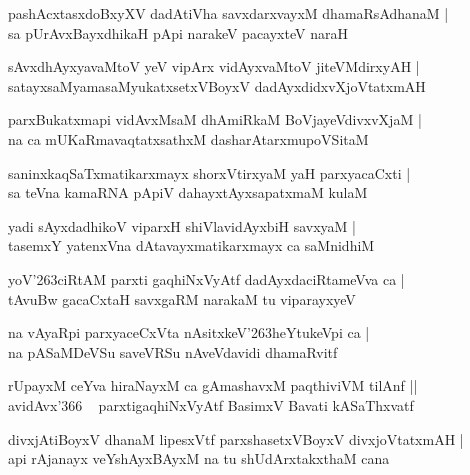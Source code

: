 \documentclass[twoside,12pt,openright]{book}
\def\S{\char'263}
\newcounter{shloka}[chapter]
\begin{document}
\begin{shloka}
pashAcxtasxdoBxyXV dadAtiVha savxdarxvayxM dhamaRsAdhanaM |\\
sa pUrAvxBayxdhikaH pApi narakeV pacayxteV naraH 
\end{shloka}

\begin{shloka}
sAvxdhAyxyavaMtoV yeV vipArx vidAyxvaMtoV jiteVMdirxyAH |\\
satayxsaMyamasaMyukatxsetxVBoyxV dadAyxdidxvXjoVtatxmAH 
\end{shloka}

\begin{shloka}
parxBukatxmapi vidAvxMsaM dhAmiRkaM BoVjayeVdivxvXjaM |\\
na ca mUKaRmavaqtatxsathxM  dasharAtarxmupoVSitaM 
\end{shloka}

\begin{shloka}
saninxkaqSaTxmatikarxmayx shorxVtirxyaM yaH parxyacaCxti |\\
sa teVna kamaRNA pApiV dahayxtAyxsapatxmaM kulaM 
\end{shloka}

\begin{shloka}
yadi sAyxdadhikoV viparxH shiVlavidAyxbiH savxyaM |\\
tasemxY yatenxVna dAtavayxmatikarxmayx ca saMnidhiM 
\end{shloka}

\begin{shloka}
yoV\S ciRtAM parxti gaqhiNxVyAtf dadAyxdaciRtameVva ca |\\
tAvuBw gacaCxtaH savxgaRM narakaM tu viparayxyeV 
\end{shloka}

\begin{shloka}
na vAyaRpi parxyaceCxVta nAsitxkeV\S heYtukeVpi ca |\\
na pASaMDeVSu saveVRSu nAveVdavidi dhamaRvitf
\end{shloka}

\begin{shloka}
rUpayxM ceYva hiraNayxM ca gAmashavxM paqthiviVM tilAnf ||\\
avidAvx\char'366 ~ parxtigaqhiNxVyAtf BasimxV Bavati kASaThxvatf 
\end{shloka}

\begin{shloka}
divxjAtiBoyxV dhanaM lipesxVtf parxshasetxVBoyxV divxjoVtatxmAH |\\
api rAjanayx veYshAyxBAyxM na tu shUdArxtakxthaM cana 
\end{shloka}
\end{document}

